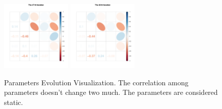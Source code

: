 \begin{figure}[h]
\includegraphics[width=0.3\textwidth,height=0.2\textheight]{Chapters/05MCMCOU/plots/paraEvolution/corMatrix47.pdf}
\includegraphics[width=0.3\textwidth,height=0.2\textheight]{Chapters/05MCMCOU/plots/paraEvolution/corMatrix48.pdf}
\caption{Parameters Evolution Visualization. The correlation among parameters doesn't change two much. The parameters are considered static. }
\end{figure}
